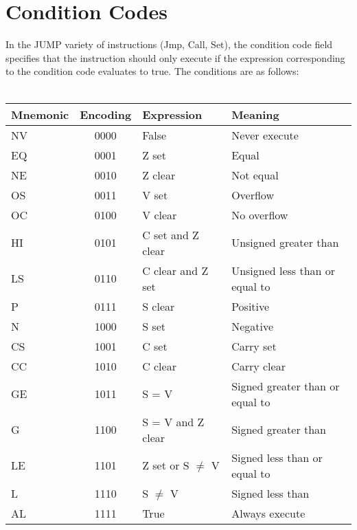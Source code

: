 \documentclass{article}
\begin{document}
	\section{Condition Codes}
	In the JUMP variety of instructions (Jmp, Call, Set), the condition code field specifies that the instruction should only execute if the expression corresponding to the condition code evaluates to true. The conditions are as follows: \\ \\
	\begin{tabular}{| l | c | l | l |} \hline
	Mnemonic & Encoding & Expression & Meaning \\ \hline
	NV &0000& False & Never execute\\ \hline
	EQ &0001& Z set & Equal\\ \hline
	NE &0010& Z clear & Not equal \\ \hline
	OS &0011& V set & Overflow \\ \hline
	OC &0100& V clear & No overflow \\ \hline
	HI &0101& C set and Z clear & Unsigned greater than \\ \hline
	LS &0110& C clear and Z set & Unsigned less than or equal to \\ \hline
	P  &0111& S clear & Positive \\ \hline
	N  &1000& S set & Negative \\ \hline
	CS &1001& C set & Carry set \\ \hline
	CC &1010& C clear & Carry clear \\ \hline
	GE &1011& S = V & Signed greater than or equal to\\ \hline
	G  &1100& S = V and Z clear & Signed greater than \\ \hline
	LE &1101& Z set or S $\neq$ V & Signed less than or equal to \\ \hline
	L  &1110& S $\neq$ V & Signed less than \\ \hline
	AL &1111& True & Always execute \\ \hline
	\end{tabular}
\end{document}

